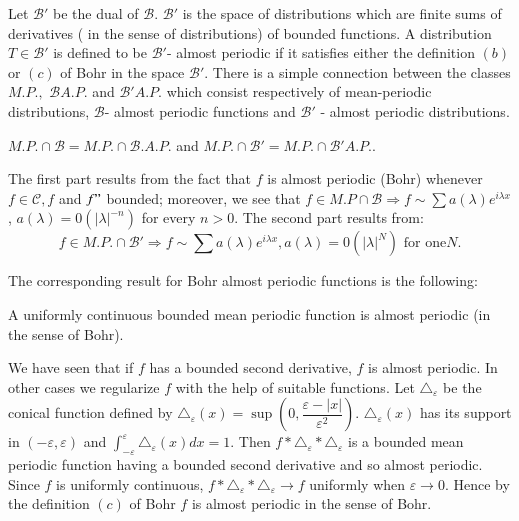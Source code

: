 Let $\mathscr{B}'$ be the dual of $\mathscr{B}$. $\mathscr{B}'$ is the
space of distributions which are finite sums of derivatives ( in the
sense of distributions) of bounded functions. A distribution $T \in
\mathscr{B}'$ is defined to be $\mathscr{B}'$- almost periodic if it
satisfies either the definition $(b)$ or $(c)$ of Bohr in the space
$\mathscr{B}'$. 
 There is a simple connection between the classes $M.P.,$ $\mathscr{B}
 A.P.$ and $\mathscr{B}' A.P.$ which consist respectively of
 mean-periodic distributions, $\mathscr{B}$- almost periodic functions
 and $\mathscr{B}'$ - almost periodic distributions. 
 \begin{theorem*}
 $M.P. \cap \mathscr{B} = M.P. \cap \mathscr{B}.A.P$. and $M.P. \cap
 \mathscr{B}' = M.P. \cap \mathscr{B}' A.P.$. 
 \end{theorem*} 

The first part results from the fact that $f$ is almost periodic\pageoriginale
(Bohr) whenever $f \in \mathscr{C}, f$ and $f"$ bounded; moreover, we
see that $f \in M.P \cap \mathscr{B} \Rightarrow f \sim \sum
a(\lambda) e^{i \lambda x}$, $a(\lambda) = 0 (\big | \lambda \big
|^{-n})$ for every $n > 0$. The second part results from: 
$$
f \in M.P. \cap \mathscr{B}' \Rightarrow f \sim \sum a (\lambda) e^{i
 \lambda x}, a (\lambda) = 0 (\big | \lambda \big |^N) \text { for
 one} N. 
$$

The corresponding result for Bohr almost periodic functions is the following:

\begin{theorem*}
 A uniformly continuous bounded mean periodic function is almost
 periodic (in the sense of Bohr). 
\end{theorem*}

We have seen that if $f$ has a bounded second derivative, $f$ is
almost periodic. In other cases we regularize $f$ with the help of
suitable functions. Let $\triangle_ \varepsilon$ be the conical
function defined by $\triangle_ \varepsilon (x) = \sup (0,
\dfrac{\varepsilon - | x |}{\varepsilon^2})$. $\triangle_ \varepsilon
(x)$ has its support in $(- \varepsilon, \varepsilon)$ and $\int^
\varepsilon_{- \varepsilon} \triangle_ \varepsilon (x) dx = 1$. Then
$f * \triangle_ \varepsilon * \triangle_ \varepsilon$ is a bounded
mean periodic function having a bounded second derivative and so
almost periodic. Since $f$ is uniformly continuous, $f * \triangle_
\varepsilon * \triangle_ \varepsilon \to f$ uniformly when
$\varepsilon \to 0$. Hence by the definition $(c)$ of Bohr $f$ is
almost periodic in the sense of Bohr. 

